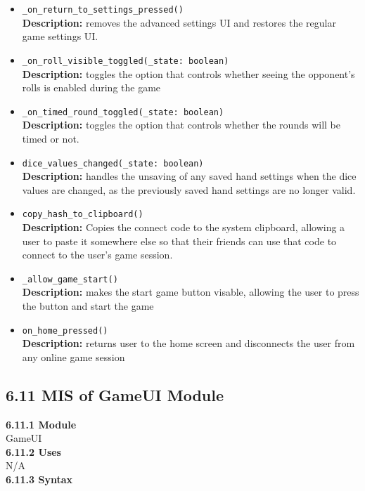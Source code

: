 \documentclass[12pt, titlepage]{article}
\begin{document}
\begin{itemize}
	\item \texttt{\_on\_return\_to\_settings\_pressed() }\\
	\textbf{Description:} removes the advanced settings UI and restores the regular game settings UI.
	\item \texttt{\_on\_roll\_visible\_toggled(\_state: boolean) }\\
	\textbf{Description:} toggles the option that controls whether seeing the opponent's rolls is enabled during the game 
	\item \texttt{\_on\_timed\_round\_toggled(\_state: boolean) }\\
	\textbf{Description:} toggles the option that controls whether the rounds will be timed or not.
	\item \texttt{dice\_values\_changed(\_state: boolean) }\\
	\textbf{Description:} handles the unsaving of any saved hand settings when the dice values are changed, as the previously saved hand settings are no longer valid.
	\item \texttt{copy\_hash\_to\_clipboard() }\\
	\textbf{Description:} Copies the connect code to the system clipboard, allowing a user to paste it somewhere else so that their friends can use that code to connect to the user's game session.
	\item \texttt{\_allow\_game\_start() }\\
	\textbf{Description:} makes the start game button visable, allowing the user to press the button and start the game
	\item \texttt{on\_home\_pressed() }\\
	\textbf{Description:} returns user to the home screen and disconnects the user from any online game session
	 
	
	
\end{itemize}

\subsection*{6.11 MIS of GameUI Module}
\textbf{6.11.1 Module}\\
 GameUI\\

\noindent \textbf{6.11.2 Uses}\\
N/A \\

\noindent \textbf{6.11.3 Syntax}
\end{document}
